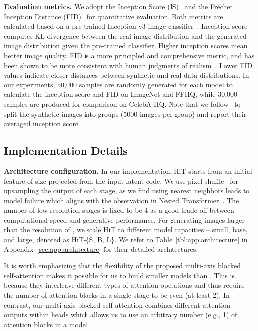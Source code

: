 \documentclass{article}
\newcommand{\app}[1]{#1}
\newcommand{\p}[1]{\textbf{#1.}}
\begin{document}
\p{Evaluation metrics} We adopt the Inception Score (IS)~\cite{salimans2016improved} and the Fr\'echet Inception Distance (FID)~\cite{heusel2017gans} for quantitative evaluation. Both metrics are calculated based on a pre-trained Inception-v3 image classifier~\cite{szegedy2016rethinking}. Inception score computes KL-divergence between the real image distribution and the generated image distribution given the pre-trained classifier. Higher inception scores mean better image quality. FID is a more principled and comprehensive metric, and has been shown to be more consistent with human judgments of realism~\cite{heusel2017gans,zhang2021cross}. Lower FID values indicate closer distances between synthetic and real data distributions. In our experiments, 50,000 samples are randomly generated for each model to calculate the inception score and FID on ImageNet and FFHQ, while 30,000 samples are produced for comparison on CelebA-HQ. Note that we follow~\cite{salimans2016improved} to split the synthetic images into groups (5000 images per group) and report their averaged inception score.

\subsection{Implementation Details}

\p{Architecture configuration} In our implementation, HiT starts from an initial feature of size  projected from the input latent code. We use pixel shuffle~\cite{shi2016real} for upsampling the output of each stage, as we find using nearest neighbors leads to model failure which aligns with the observation in Nested Transformer~\cite{zhang2021aggregating}. The number of low-resolution stages is fixed to be 4 as a good trade-off between computational speed and generative performance. For generating images larger than the resolution of , we scale HiT to different model capacities -- small, base, and large, denoted as HiT-\{S, B, L\}. We refer to \app{Table~\ref{tbl:app:architecture} in Appendix~\ref{sec:app:architecture}} for their detailed architectures.

It is worth emphasizing that the flexibility of the proposed multi-axis blocked self-attention makes it possible for us to build smaller models than \cite{liu2021swin}. This is because they interleave different types of attention operations and thus require the number of attention blocks in a single stage to be even (at least 2). In contrast, our multi-axis blocked self-attention combines different attention outputs within heads which allows us to use an arbitrary number (e.g., 1) of attention blocks in a model.
\end{document}
